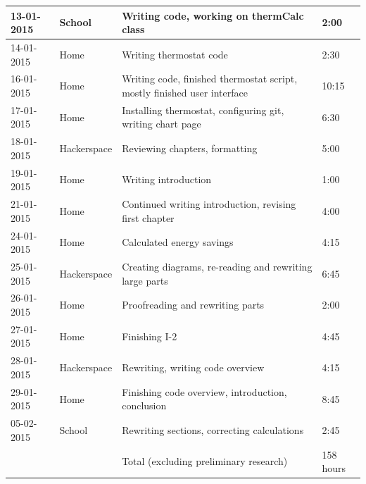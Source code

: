 \documentclass[12pt,a4paper,final]{report}
\begin{document}
\begin{longtable}{ | p{2.5cm} | p{2.5cm} | p{5cm} | p{2cm} |}
	\hline
	13-01-2015 & School & Writing code, working on thermCalc class & 2:00 \\
	\hline
	14-01-2015 & Home & Writing thermostat code & 2:30 \\
	\hline
	16-01-2015 & Home & Writing code, finished thermostat script, mostly finished user interface & 10:15 \\
	\hline
	17-01-2015 & Home & Installing thermostat, configuring git, writing chart page & 6:30 \\
	\hline
	18-01-2015 & Hackerspace & Reviewing chapters, formatting & 5:00 \\
	\hline
	19-01-2015 & Home & Writing introduction & 1:00 \\
	\hline
	21-01-2015 & Home & Continued writing introduction, revising first chapter & 4:00 \\
	\hline
	24-01-2015 & Home & Calculated energy savings & 4:15 \\
	\hline
	25-01-2015 & Hackerspace & Creating diagrams, re-reading and rewriting large parts & 6:45 \\
	\hline
	26-01-2015 & Home & Proofreading and rewriting parts & 2:00 \\
	\hline
	27-01-2015 & Home & Finishing I-2 & 4:45\\
	\hline
	28-01-2015 & Hackerspace & Rewriting, writing code overview & 4:15 \\
	\hline
	29-01-2015 & Home & Finishing code overview, introduction, conclusion & 8:45 \\
	\hline 
	05-02-2015 & School & Rewriting sections, correcting calculations & 2:45\\
	\hline
	& & Total (excluding preliminary research) & 158 hours\\
	\hline
    \end{longtable}
\endgroup

\listoffigures
\listoftables
\end{document}
